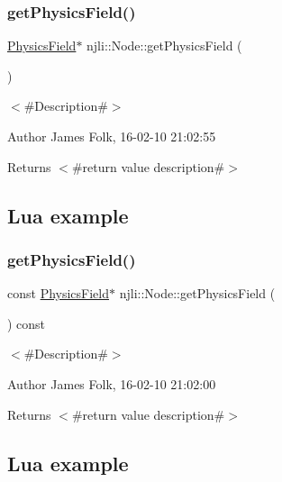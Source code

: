 \subsubsection{\texorpdfstring{get\+Physics\+Field()}{getPhysicsField()}\hspace{0.1cm}{\footnotesize\ttfamily [1/2]}}
{\footnotesize\ttfamily \mbox{\hyperlink{classnjli_1_1_physics_field}{Physics\+Field}}$\ast$ njli\+::\+Node\+::get\+Physics\+Field (\begin{DoxyParamCaption}{ }\end{DoxyParamCaption})}



$<$\#\+Description\#$>$ 

\begin{DoxyAuthor}{Author}
James Folk, 16-\/02-\/10 21\+:02\+:55
\end{DoxyAuthor}
\begin{DoxyReturn}{Returns}
$<$\#return value description\#$>$
\end{DoxyReturn}
\hypertarget{classnjli_1_1_steering_behavior_wander_ex1}{}\subsection{Lua example}\label{classnjli_1_1_steering_behavior_wander_ex1}

\begin{DoxyCodeInclude}
\end{DoxyCodeInclude}
\mbox{\label{classnjli_1_1_node_ab7e8423c99ad7ca2ee69e04c9b0b8608}} 
\subsubsection{\texorpdfstring{get\+Physics\+Field()}{getPhysicsField()}\hspace{0.1cm}{\footnotesize\ttfamily [2/2]}}
{\footnotesize\ttfamily const \mbox{\hyperlink{classnjli_1_1_physics_field}{Physics\+Field}}$\ast$ njli\+::\+Node\+::get\+Physics\+Field (\begin{DoxyParamCaption}{ }\end{DoxyParamCaption}) const}



$<$\#\+Description\#$>$ 

\begin{DoxyAuthor}{Author}
James Folk, 16-\/02-\/10 21\+:02\+:00
\end{DoxyAuthor}
\begin{DoxyReturn}{Returns}
$<$\#return value description\#$>$
\end{DoxyReturn}
\hypertarget{classnjli_1_1_steering_behavior_wander_ex1}{}\subsection{Lua example}\label{classnjli_1_1_steering_behavior_wander_ex1}

